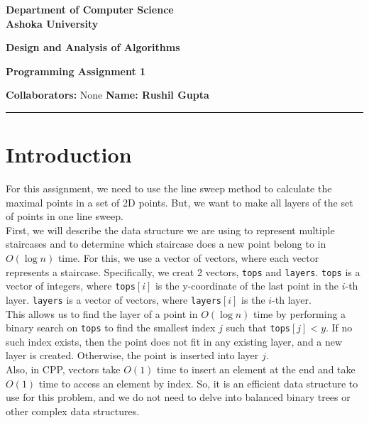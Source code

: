 \documentclass[a4paper]{article}
\begin{document}
\begin{center}
{\large \bf \color{red}  Department of Computer Science} \\
{\large \bf \color{red}  Ashoka University} \\

\vspace{0.1in}

{\large \bf \color{blue} Design and Analysis of Algorithms}

\vspace{0.05in}

    { \bf \color{YellowOrange} Programming Assignment 1}
\end{center}
\medskip

{\textbf{Collaborators:} None} \hfill {\textbf{Name: Rushil Gupta} }

\bigskip
\hrule

\section*{Introduction}
For this assignment, we need to use the line sweep method to calculate the maximal points in a set of 2D points. But, we want to make all layers of the set of points in one line sweep.\\

\noindent First, we will describe the data structure we are using to represent multiple staircases and to determine which staircase does a new point belong to in $O(\log n)$ time. For this, we use a vector of vectors, where each vector represents a staircase. Specifically, we creat 2 vectors, \texttt{tops} and \texttt{layers}. \texttt{tops} is a vector of integers, where \texttt{tops}$[i]$ is the y-coordinate of the last point in the $i$-th layer. \texttt{layers} is a vector of vectors, where \texttt{layers}$[i]$ is the $i$-th layer.\\

\noindent This allows us to find the layer of a point in $O(\log n)$ time by performing a binary search on \texttt{tops} to find the smallest index $j$ such that \texttt{tops}$[j] < y$. If no such index exists, then the point does not fit in any existing layer, and a new layer is created. Otherwise, the point is inserted into layer $j$.\\

\noindent Also, in CPP, vectors take $O(1)$ time to insert an element at the end and take $O(1)$ time to access an element by index. So, it is an efficient data structure to use for this problem, and we do not need to delve into balanced binary trees or other complex data structures.
\end{document}
